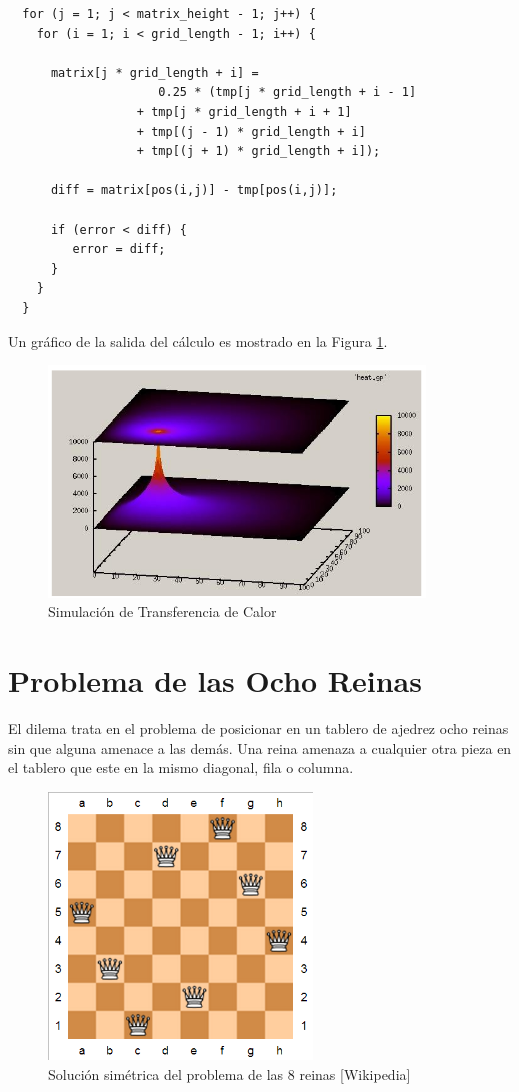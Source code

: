 \documentclass[a4paper]{report}
\begin{document}
\begin{lstlisting}
  for (j = 1; j < matrix_height - 1; j++) {
    for (i = 1; i < grid_length - 1; i++) {
      
      matrix[j * grid_length + i] = 
                     0.25 * (tmp[j * grid_length + i - 1]
                  + tmp[j * grid_length + i + 1]
                  + tmp[(j - 1) * grid_length + i]
                  + tmp[(j + 1) * grid_length + i]);

      diff = matrix[pos(i,j)] - tmp[pos(i,j)];

      if (error < diff) {
         error = diff;
      }
    }
  }
\end{lstlisting}

Un gráfico de la salida del cálculo es mostrado en la Figura \ref{fig:heat}.

\begin{figure}[H]
\centering
\includegraphics[width=10cm]{heat2d.png}
\caption{Simulación de Transferencia de Calor}
\label{fig:heat}
\end{figure}

\section{Problema de las Ocho Reinas}

El dilema trata en el problema de posicionar en un tablero de ajedrez ocho
reinas sin que alguna amenace a las demás. Una reina amenaza a cualquier otra
pieza en el tablero que este en la mismo diagonal, fila o columna.

\begin{figure}[H]
\begin{center}
\includegraphics[width=7cm]{queen.png}
\caption{Solución simétrica del problema de las 8 reinas [Wikipedia]}
\end{center}
\end{figure}
\end{document}
